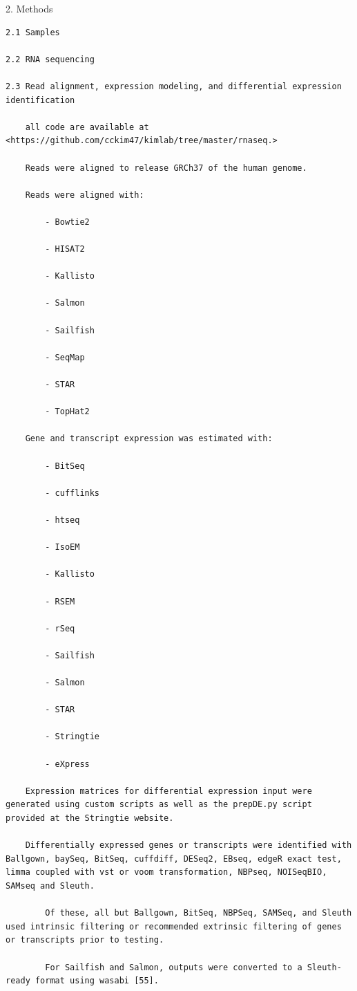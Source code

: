\documentclass[
]{book}
\begin{document}
2. Methods

\begin{verbatim}
2.1 Samples

2.2 RNA sequencing

2.3 Read alignment, expression modeling, and differential expression identification

    all code are available at <https://github.com/cckim47/kimlab/tree/master/rnaseq.>

    Reads were aligned to release GRCh37 of the human genome.

    Reads were aligned with:

        - Bowtie2

        - HISAT2

        - Kallisto

        - Salmon

        - Sailfish

        - SeqMap

        - STAR

        - TopHat2

    Gene and transcript expression was estimated with:

        - BitSeq

        - cufflinks

        - htseq

        - IsoEM

        - Kallisto

        - RSEM

        - rSeq

        - Sailfish

        - Salmon

        - STAR

        - Stringtie

        - eXpress

    Expression matrices for differential expression input were generated using custom scripts as well as the prepDE.py script provided at the Stringtie website.

    Differentially expressed genes or transcripts were identified with Ballgown, baySeq, BitSeq, cuffdiff, DESeq2, EBseq, edgeR exact test, limma coupled with vst or voom transformation, NBPseq, NOISeqBIO, SAMseq and Sleuth.

        Of these, all but Ballgown, BitSeq, NBPSeq, SAMSeq, and Sleuth used intrinsic filtering or recommended extrinsic filtering of genes or transcripts prior to testing.

        For Sailfish and Salmon, outputs were converted to a Sleuth-ready format using wasabi [55].


\end{verbatim}
\end{document}
